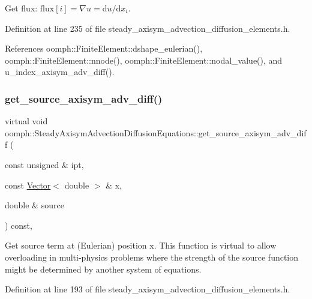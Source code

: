 Get flux\+: $ \mbox{flux}[i] = \nabla u = \mbox{d}u / \mbox{d}x_i $. 



Definition at line 235 of file steady\+\_\+axisym\+\_\+advection\+\_\+diffusion\+\_\+elements.\+h.



References oomph\+::\+Finite\+Element\+::dshape\+\_\+eulerian(), oomph\+::\+Finite\+Element\+::nnode(), oomph\+::\+Finite\+Element\+::nodal\+\_\+value(), and u\+\_\+index\+\_\+axisym\+\_\+adv\+\_\+diff().

\mbox{\label{classoomph_1_1SteadyAxisymAdvectionDiffusionEquations_a3e934ba20c0415976c8ef68e639c245a}} 
\subsubsection{\texorpdfstring{get\+\_\+source\+\_\+axisym\+\_\+adv\+\_\+diff()}{get\_source\_axisym\_adv\_diff()}}
{\footnotesize\ttfamily virtual void oomph\+::\+Steady\+Axisym\+Advection\+Diffusion\+Equations\+::get\+\_\+source\+\_\+axisym\+\_\+adv\+\_\+diff (\begin{DoxyParamCaption}\item[{const unsigned \&}]{ipt,  }\item[{const \hyperlink{classoomph_1_1Vector}{Vector}$<$ double $>$ \&}]{x,  }\item[{double \&}]{source }\end{DoxyParamCaption}) const\hspace{0.3cm}{\ttfamily [inline]}, {\ttfamily [virtual]}}



Get source term at (Eulerian) position x. This function is virtual to allow overloading in multi-\/physics problems where the strength of the source function might be determined by another system of equations. 



Definition at line 193 of file steady\+\_\+axisym\+\_\+advection\+\_\+diffusion\+\_\+elements.\+h.



